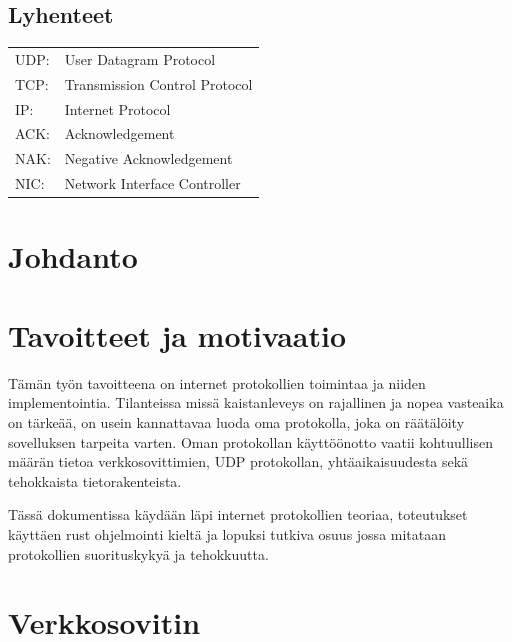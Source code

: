 \documentclass[a4paper,12pt]{article}
\begin{document}
\begin{titlepage}
        \tableofcontents
        \newpage
        \thispagestyle{empty}


            \section*{Lyhenteet}
            \begin{tabular}{l l}
                UDP: & User Datagram Protocol        \\
                TCP: & Transmission Control Protocol \\
                IP:  & Internet Protocol             \\
                ACK: & Acknowledgement               \\
                NAK: & Negative Acknowledgement      \\
                NIC: & Network Interface Controller  \\
            \end{tabular}
            \newpage


    \end{titlepage}


        \section{Johdanto}\label{sec:johdanto}
        \blindtext

\section{Tavoitteet ja motivaatio}
Tämän työn tavoitteena on internet protokollien toimintaa ja niiden implementointia. Tilanteissa missä kaistanleveys on rajallinen ja nopea vasteaika on tärkeää, on usein kannattavaa luoda oma protokolla, joka on räätälöity sovelluksen tarpeita varten. 
Oman protokollan käyttöönotto vaatii kohtuullisen määrän tietoa verkkosovittimien, UDP protokollan, yhtäaikaisuudesta sekä tehokkaista tietorakenteista.\par
Tässä dokumentissa käydään läpi internet protokollien teoriaa, toteutukset käyttäen rust ohjelmointi kieltä ja lopuksi tutkiva osuus jossa mitataan protokollien suorituskykyä ja tehokkuutta.
        \section{Verkkosovitin}\label{sec:verkkosovitin}
        \blindtext
\end{document}
